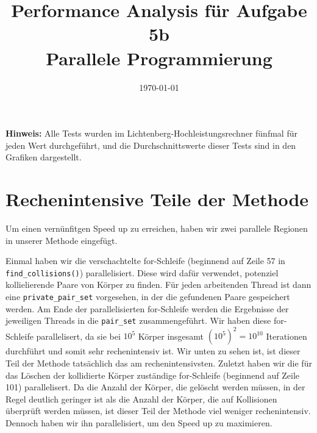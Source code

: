 \documentclass[
  ngerman,
  color=8c,
  submission,
  boxarc,
  fleqn,
]{rubos-tuda-template}
\date{\today}
\begin{document}
\title[Parallele Programmierung]{Performance Analysis für Aufgabe 5b\\ Parallele Programmierung}

\maketitle{}
\textbf{Hinweis:} Alle Tests wurden im Lichtenberg-Hochleistungsrechner fünfmal für jeden Wert durchgeführt, und die Durchschnittswerte dieser Tests sind in den Grafiken dargestellt.

\section{Rechenintensive Teile der Methode}
Um einen vernünfitgen Speed up zu erreichen, haben wir zwei parallele Regionen in unserer Methode eingefügt. 

Einmal haben wir die verschachtelte for-Schleife (beginnend auf Zeile 57 in \verb|find_collisions()|) parallelisiert. Diese wird dafür verwendet, potenziel kollielierende Paare von Körper zu finden. Für jeden arbeitenden Thread ist dann eine \verb|private_pair_set| vorgesehen, in der die gefundenen Paare gespeichert werden. Am Ende der parallelisierten for-Schleife werden die Ergebnisse der jeweiligen Threads in die \verb|pair_set| zusammengeführt. Wir haben diese for-Schleife parallelisert, da sie bei $10^5$ Körper insgesamt $(10^5)^2 = 10^{10}$ Iterationen durchführt und somit sehr rechenintensiv ist. Wir unten zu sehen ist, ist dieser Teil der Methode tatsächlich das am rechenintensivsten. 
Zuletzt haben wir die für das Löschen der kollidierte Körper zuständige for-Schleife (beginnend auf Zeile 101) parallelisert. Da die Anzahl der Körper, die gelöscht werden müssen, in der Regel deutlich geringer ist als die Anzahl der Körper, die auf Kollisionen überprüft werden müssen, ist dieser Teil der Methode viel weniger rechenintensiv. Dennoch haben wir ihn parallelisiert, um den Speed up zu maximieren. \newline
\end{document}
